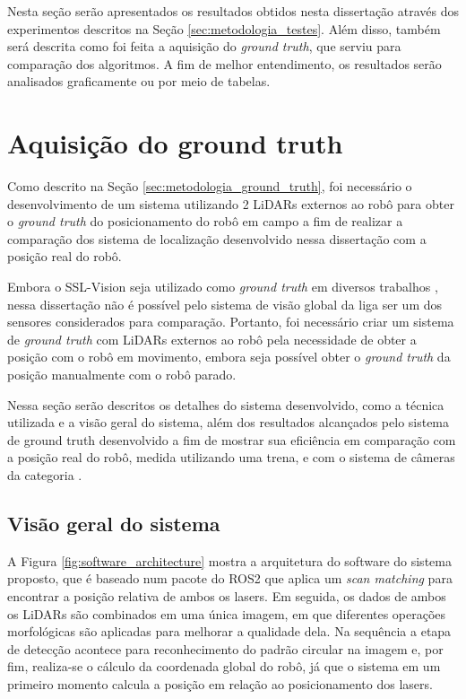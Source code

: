 \documentclass[acronym, symbols, table, deposito]{fei}
\begin{document}
		Nesta seção serão apresentados os resultados obtidos nesta dissertação através dos experimentos descritos na Seção \ref{sec:metodologia_testes}. Além disso, também será descrita como foi feita a aquisição do \textit{ground truth}, que serviu para comparação dos algoritmos. A fim de melhor entendimento, os resultados serão analisados graficamente ou por meio de tabelas.
		
		\section{Aquisição do ground truth} \label{sec:resultados_ground_truth}
		
			Como descrito na Seção \ref{sec:metodologia_ground_truth}, foi necessário o desenvolvimento de um sistema utilizando 2 LiDARs externos ao robô para obter o \textit{ground truth} do posicionamento do robô em campo a fim de realizar a comparação dos sistema de localização desenvolvido nessa dissertação com a posição real do robô. 
			
			Embora o SSL-Vision seja utilizado como \textit{ground truth} em diversos trabalhos \cite{9018557, melo2022embedded}, nessa dissertação não é possível pelo sistema de visão global da liga ser um dos sensores considerados para comparação. Portanto, foi necessário criar um sistema de \textit{ground truth} com LiDARs externos ao robô pela necessidade de obter a posição com o robô em movimento, embora seja possível obter o \textit{ground truth} da posição manualmente com o robô parado.
			
			Nessa seção serão descritos os detalhes do sistema desenvolvido, como a técnica utilizada e a visão geral do sistema, além dos resultados alcançados pelo sistema de ground truth desenvolvido a fim de mostrar sua eficiência em comparação com a posição real do robô, medida utilizando uma trena, e com o sistema de câmeras da categoria .
		
			\subsection{Visão geral do sistema}
				
				A Figura \ref{fig:software_architecture} mostra a arquitetura do software do sistema proposto, que é baseado num pacote do ROS2 que aplica um \textit{scan matching} para encontrar a posição relativa de ambos os lasers. Em seguida, os dados de ambos os LiDARs são combinados em uma única imagem, em que diferentes operações morfológicas são aplicadas para melhorar a qualidade dela. Na sequência a etapa de detecção acontece para reconhecimento do padrão circular na imagem e, por fim, realiza-se o cálculo da coordenada global do robô, já que o sistema em um primeiro momento calcula a posição em relação ao posicionamento dos lasers.
					
\end{document}

